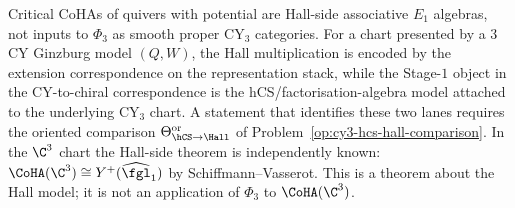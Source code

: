 \begin{remark}
\label{rem:phi-d-vs-coha}
Critical CoHAs of quivers with potential are Hall-side associative
$E_1$ algebras, not inputs to $\Phi_3$ as smooth proper CY$_3$
categories. For a chart presented by a $3$CY Ginzburg model $(Q,W)$,
the Hall multiplication is encoded by the extension correspondence on
the representation stack, while the Stage-$1$ object in the
CY-to-chiral correspondence is the hCS/factorisation-algebra model attached
to the underlying CY$_3$ chart. A statement that identifies these two
lanes requires the oriented comparison
$\Theta_{\hCS\to\Hall}^{\mathrm{or}}$ of
Problem~\ref{op:cy3-hcs-hall-comparison}. In the $\C^3$ chart the
Hall-side theorem is independently known:
$\CoHA(\C^3)\cong Y^+(\widehat{\fgl}_1)$ by
Schiffmann--Vasserot. This is a theorem about the Hall model; it is not
an application of $\Phi_3$ to $\CoHA(\C^3)$.
\end{remark}

